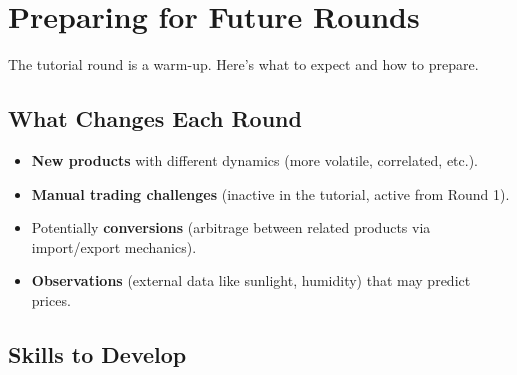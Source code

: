 \documentclass[11pt, letterpaper]{article}
\begin{document}
\section{Preparing for Future Rounds}

The tutorial round is a warm-up. Here's what to expect and how to prepare.

\subsection{What Changes Each Round}

\begin{itemize}
    \item \textbf{New products} with different dynamics (more volatile, correlated, etc.).
    \item \textbf{Manual trading challenges} (inactive in the tutorial, active from Round 1).
    \item Potentially \textbf{conversions} (arbitrage between related products via import/export mechanics).
    \item \textbf{Observations} (external data like sunlight, humidity) that may predict prices.
\end{itemize}

\subsection{Skills to Develop}
\end{document}
